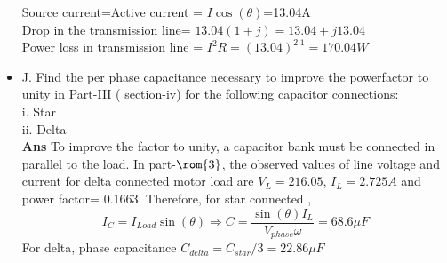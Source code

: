 \documentclass[12pt]{article}
\begin{document}
\begin{itemize}
      Source current=Active current = $I\cos(\theta)$=13.04A\\
      Drop in the transmission line= $13.04(1+j)=13.04+j13.04$\\ 
      Power loss in transmission line = $I^2R=(13.04)^2.1=170.04W$
      \item J. Find the per phase capacitance necessary to improve the powerfactor to unity in Part-III ( section-iv) for the following capacitor connections:\\
      i. Star \\
      ii. Delta\vspace{0.2cm} \\
      \textbf{Ans} To improve the factor to unity, a capacitor bank must be connected in parallel to the load. In part-$\rom{3}$, the observed values of line voltage and current for delta connected motor load are $V_L=216.05$, $I_L=2.725A$ and power factor= 0.1663.
      Therefore, for star connected ,$$I_C=I_{Load}\sin(\theta)\Rightarrow C=\frac{\sin(\theta
      )I_L}{V_{phase}\omega}=68.6\mu F$$
      For delta, phase capacitance $C_{delta}=C_{star}/3=22.86\mu F$
  \end{itemize}
\end{document}
